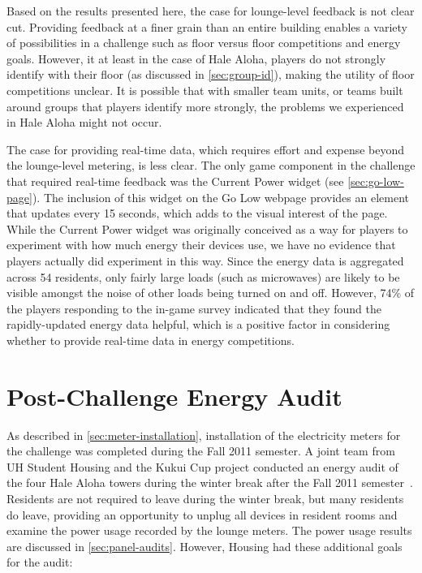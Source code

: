 Based on the results presented here, the case for lounge-level feedback is not clear cut. Providing feedback at a finer grain than an entire building enables a variety of possibilities in a challenge such as floor versus floor competitions and energy goals. However, it at least in the case of Hale Aloha, players do not strongly identify with their floor (as discussed in \autoref{sec:group-id}), making the utility of floor competitions unclear. It is possible that with smaller team units, or teams built around groups that players identify more strongly, the problems we experienced in Hale Aloha might not occur.

The case for providing real-time data, which requires effort and expense beyond the lounge-level metering, is less clear. The only game component in the challenge that required real-time feedback was the Current Power widget (see \autoref{sec:go-low-page}). The inclusion of this widget on the Go Low webpage provides an element that updates every 15 seconds, which adds to the visual interest of the page. While the Current Power widget was originally conceived as a way for players to experiment with how much energy their devices use, we have no evidence that players actually did experiment in this way. Since the energy data is aggregated across 54 residents, only fairly large loads (such as microwaves) are likely to be visible amongst the noise of other loads being turned on and off. However, 74\% of the players responding to the in-game survey indicated that they found the rapidly-updated energy data helpful, which is a positive factor in considering whether to provide real-time data in energy competitions.


\section{Post-Challenge Energy Audit}
\label{sec:post-energy-audit}

As described in \autoref{sec:meter-installation}, installation of the electricity meters for the challenge was completed during the Fall 2011 semester. A joint team from UH \Manoa Student Housing and the Kukui Cup project conducted an energy audit of the four Hale Aloha towers during the winter break after the Fall 2011 semester~\cite{csdl2-11-12}. Residents are not required to leave during the winter break, but many residents do leave, providing an opportunity to unplug all devices in resident rooms and examine the power usage recorded by the lounge meters. The power usage results are discussed in \autoref{sec:panel-audits}. However, Housing had these additional goals for the audit:

